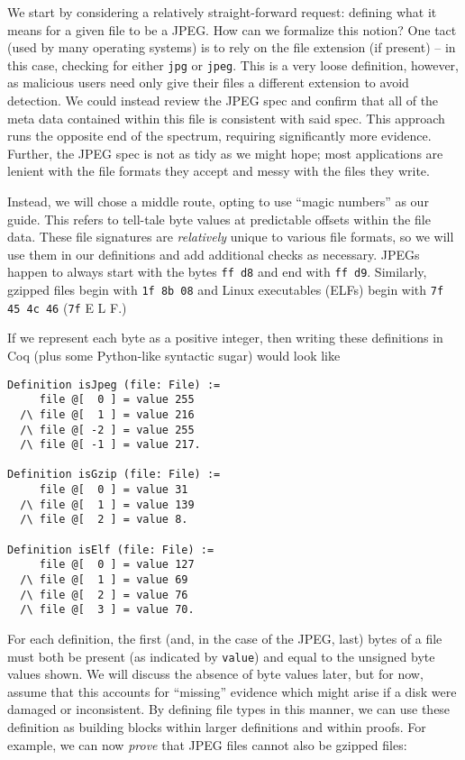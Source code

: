 \documentclass[nocopyrightspace]{sigplanconf}
\begin{document}
We start by considering a relatively straight-forward request: defining what
it means for a given file to be a JPEG. How can we formalize this notion? One
tact (used by many operating systems) is to rely on the file extension (if
present) -- in this case, checking for either {\tt jpg} or {\tt jpeg}. This is
a very loose definition, however, as malicious users need only give their
files a different extension to avoid detection. We could instead review the
JPEG spec and confirm that all of the meta data contained within this file is
consistent with said spec. This approach runs the opposite end of the
spectrum, requiring significantly more evidence. Further, the JPEG spec is not
as tidy as we might hope; most applications are lenient with the file formats
they accept and messy with the files they write.

Instead, we will chose a middle route, opting to use ``magic numbers'' as our
guide. This refers to tell-tale byte values at predictable offsets within the
file data. These file signatures are {\it relatively} unique to various file
formats, so we will use them in our definitions and add additional checks as
necessary. JPEGs happen to always start with the bytes {\tt ff d8} and end
with {\tt ff d9}. Similarly, gzipped files begin with {\tt 1f 8b 08} and Linux
executables (ELFs) begin with {\tt 7f 45 4c 46} ({\tt 7f} E L F.)

If we represent each byte as a positive integer, then writing these
definitions in Coq (plus some Python-like syntactic sugar) would look like

\begin{lstlisting}
Definition isJpeg (file: File) :=
     file @[  0 ] = value 255
  /\ file @[  1 ] = value 216 
  /\ file @[ -2 ] = value 255
  /\ file @[ -1 ] = value 217.

Definition isGzip (file: File) :=
     file @[  0 ] = value 31
  /\ file @[  1 ] = value 139 
  /\ file @[  2 ] = value 8.

Definition isElf (file: File) :=
     file @[  0 ] = value 127
  /\ file @[  1 ] = value 69 
  /\ file @[  2 ] = value 76
  /\ file @[  3 ] = value 70.
\end{lstlisting}

For each definition, the first (and, in the case of the JPEG, last) bytes of a
file must both be present (as indicated by {\tt value}) and equal to the
unsigned byte values shown. We will discuss the absence of byte values later,
but for now, assume that this accounts for ``missing'' evidence which might
arise if a disk were damaged or inconsistent. By defining file types in this
manner, we can use these definition as building blocks within larger
definitions and within proofs. For example, we can now {\it prove} that JPEG
files cannot also be gzipped files:
\end{document}
